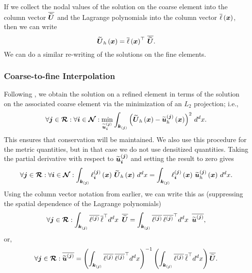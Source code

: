If we collect the nodal values of the solution on the coarse element
into the column vector $\overline{\widetilde{\boldsymbol{U}}}$ and the
Lagrange polynomials into the column vector $\overline{\ell}\left(\boldsymbol{x}\right)$,
then we can write
\begin{equation}
  \widetilde{\boldsymbol{U}}_{h}\left(\boldsymbol{x}\right)
  =\overline{\ell}\left(\boldsymbol{x}\right)^{\top}\,\overline{\widetilde{\boldsymbol{U}}}.
\end{equation}
We can do a similar re-writing of the solutions on the fine elements.

\subsubsection{Coarse-to-fine Interpolation}

Following \citet{sbc2015}, we obtain the solution on a refined element
in terms of the solution on the associated coarse element
via the minimization of an $L_{2}$ projection; i.e.,
\begin{equation}
  \forall\boldsymbol{j}\in\boldsymbol{\mathcal{R}}:\forall\boldsymbol{i}\in\boldsymbol{\mathcal{N}}:
  \min\limits_{\widetilde{\boldsymbol{u}}^{\left(\boldsymbol{j}\right)}_{\boldsymbol{i}}}
  \int_{\boldsymbol{k}_{\left(\boldsymbol{j}\right)}}
  \left(\widetilde{\boldsymbol{U}}_{h}\left(\boldsymbol{x}\right)
  -\widetilde{\boldsymbol{u}}_{h}^{\left(\boldsymbol{j}\right)}\left(\boldsymbol{x}\right)\right)^{2}\,
  d^{d}x.
\end{equation}
This ensures that conservation will be maintained.
We also use this procedure for the metric quantities, but in that case we
do not use densitized quantities.
Taking the partial derivative with respect to
$\widetilde{\boldsymbol{u}}_{\boldsymbol{i}}^{\left(\boldsymbol{j}\right)}$ and setting the result to zero
gives
\begin{equation}
  \forall\bs{j}\in\bc{R}:\forall\bs{i}\in\bc{N}:
  \int_{\bs{k}_{\bj}}
  \ell_{\bs{i}}^{\bj}\left(\bs{x}\right)\,
  \wt{\bs{U}}_{h}\left(\bs{x}\right)\,d^{d}x
  =\int_{\bs{k}_{\bj}}
  \ell_{\bs{i}}^{\bj}\left(\bs{x}\right)\,
  \wt{\bs{u}}_{h}^{\bj}\left(\bs{x}\right)\,d^{d}x.
  \label{eq.refine}
\end{equation}
Using the column vector notation from earlier, we can write this as
(suppressing the spatial dependence of the Lagrange polynomials)
\begin{equation}
  \forall\boldsymbol{j}\in\boldsymbol{\mathcal{R}}:
  \int_{\boldsymbol{k}_{\left(\boldsymbol{j}\right)}}
  \overline{\ell^{\left(\boldsymbol{j}\right)}}\,
  \overline{\ell}^{\top} d^{d}x\hspace{0.5em}
  \overline{\widetilde{\boldsymbol{U}}}
  =\int_{\boldsymbol{k}_{\left(\boldsymbol{j}\right)}}
  \overline{\ell^{\left(\boldsymbol{j}\right)}}\,
  \overline{\ell^{\left(\boldsymbol{j}\right)}}^{\top} d^{d}x\hspace{0.5em}
  \overline{\widetilde{\boldsymbol{u}}^{\left(\boldsymbol{j}\right)}},
\end{equation}
or,
\begin{equation}
  \forall\boldsymbol{j}\in\boldsymbol{\mathcal{R}}:
  \overline{\widetilde{\boldsymbol{u}}^{\left(\boldsymbol{j}\right)}}
  =\left(\int_{\boldsymbol{k}_{\left(\boldsymbol{j}\right)}}
  \overline{\ell^{\left(\boldsymbol{j}\right)}}\,
  \overline{\ell^{\left(\boldsymbol{j}\right)}}^{\top} d^{d}x\right)^{-1}
  \left(\int_{\boldsymbol{k}_{\left(\boldsymbol{j}\right)}}
  \overline{\ell^{\left(\boldsymbol{j}\right)}}\,
  \overline{\ell}^{\top} d^{d}x\right)
  \overline{\widetilde{\boldsymbol{U}}}.\label{eq.ref1}
\end{equation}
